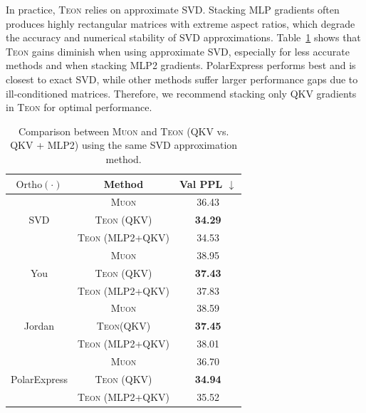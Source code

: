 \documentclass{article}
\theoremstyle{plain}
\theoremstyle{definition}
\theoremstyle{remark}
\begin{document}
In practice, \textsc{Teon} relies on approximate SVD. Stacking MLP gradients often produces highly rectangular matrices with extreme aspect ratios, which degrade the accuracy and numerical stability of SVD approximations. Table~\ref{tab:Teon_appro_SVD_paired} shows that \textsc{Teon} gains diminish when using approximate SVD, especially for less accurate methods and when stacking MLP2 gradients. PolarExpress performs best and is closest to exact SVD, while other methods suffer larger performance gaps due to ill-conditioned matrices. Therefore, we recommend stacking only QKV gradients in \textsc{Teon} for optimal performance.

\begin{table}[t]
\centering
\small
\begin{tabular}{c c c}
\hline
$\mathrm{Ortho}(\cdot)$ & \textbf{Method} & \textbf{Val PPL} $\downarrow$ \\
\hline
\multirow{3}{*}{SVD}
& \textsc{Muon} & 36.43 \\
& \textsc{Teon} (QKV) & \textbf{34.29} \\
& \textsc{Teon} (MLP2+QKV) & 34.53 \\
\hline
\multirow{3}{*}{You}
& \textsc{Muon} & 38.95 \\
& \textsc{Teon} (QKV) & \textbf{37.43} \\
& \textsc{Teon} (MLP2+QKV) & 37.83 \\
\hline
\multirow{3}{*}{Jordan}
& \textsc{Muon} & 38.59 \\
& \textsc{Teon}(QKV) & \textbf{37.45} \\
& \textsc{Teon} (MLP2+QKV) & 38.01 \\
\hline
\multirow{3}{*}{PolarExpress}
& \textsc{Muon} & 36.70 \\
& \textsc{Teon} (QKV) & \textbf{34.94} \\
& \textsc{Teon} (MLP2+QKV) & 35.52 \\
\hline
\end{tabular}
\caption{\footnotesize Comparison between \textsc{Muon} and \textsc{Teon} (QKV vs. QKV + MLP2) using the same SVD approximation method.}
\label{tab:Teon_appro_SVD_paired}
\end{table}
\end{document}
